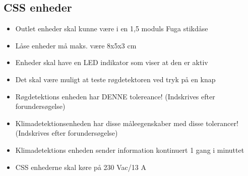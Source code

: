 \subsection*{CSS enheder}
\begin{itemize}
\item Outlet enheder skal kunne være i en 1,5 moduls Fuga stikdåse
\item Låse enheder må maks. være 8x5x3 cm
\item Enheder skal have en LED indikator som viser at den er aktiv
\item Det skal være muligt at teste røgdetektoren ved tryk på en knap
\item Røgdetektions enheden har DENNE tolereance! (Indskrives efter forundersøgelse)
\item Klimadetektionsenheden har disse måleegenskaber med disse tolerancer! (Indskrives efter forundersøgelse)
\item Klimadetektions enheden sender information kontinuert 1 gang i minuttet
\item CSS enhederne skal køre på 230 Vac/13 A
\end{itemize}
